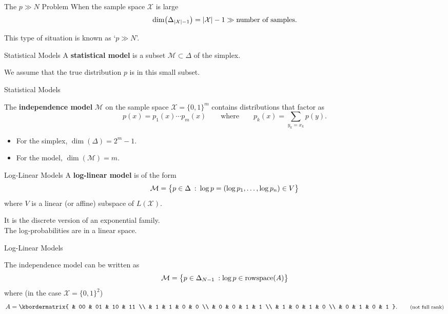 \documentclass[xcolor=dvipsnames]{beamer}
\newcommand*{\as}{A}
\newcommand*{\xs}{\mathcal{X}}
\newcommand*{\ms}{\mathcal{M}}
\begin{document}
\begin{frame}{The $p \gg N$ Problem}
    When the sample space $\xs$ is large
    \[
        \dim\pdel*{\Delta_{|\xs| - 1}} = |\xs| - 1 \gg \text{number of samples}.
    \]

    This type of situation is known as `$p \gg N$'.
\end{frame}

\begin{frame}{Statistical Models}
    A \textbf{statistical model} is a subset $\ms \subset \Delta$ of the
    simplex.

    We assume that the true distribution $p$ is in this small subset.
\end{frame}

\begin{frame}{Statistical Models}
    \begin{example}[Independence]
        The \textbf{independence model} $\ms$ on the sample space $\xs = \{0,
        1\}^m$ contains distributions that factor as
        \[
            p(x) = p_1(x) \cdots p_m(x)
            \qquad\text{where}\qquad
            p_k(x) = \sum_{y_k = x_k} p(y).
        \]
        \nlspace
        \begin{itemize}
        \item For the simplex, $\dim(\Delta) = 2^m - 1$.
        \item For the model, $\dim(\ms) = m$.
        \end{itemize}
    \end{example}
\end{frame}

\begin{frame}{Log-Linear Models}
    A \textbf{log-linear model} is of the form
    \[
        \ms = \cdel[\big]{ p \in \Delta
        \::\: \log p  = (\log p_1, \ldots, \log p_n) \in V}
    \]
    where $V$ is a linear (or affine) subspace of $L(\xs)$.

    It is the discrete version of an exponential family. \\
    The log-probabilities are in a linear space.
\end{frame}

\begin{frame}{Log-Linear Models}
    \begin{example}[Independence]
    The independence model can be written as 
    \[
        \ms = \cdel[\big]{ p \in \Delta_{N-1}
        \:: \log p  \in \mathrm{rowspace}(\as)}
    \]
    where (in the case $\xs = \{0, 1\}^2$)
    \[
        \as = \kbordermatrix{
            & 00 & 01 & 10 & 11 \\
            &  1 & 1  & 0  & 0 \\
            &  0 & 0  & 1  & 1 \\
            &  1 & 0  & 1  & 0 \\
            &  0 & 1  & 0  & 1
        }.
        \qquad
        \text{\footnotesize (not full rank)}
    \]
    \end{example}
\end{frame}
\end{document}
